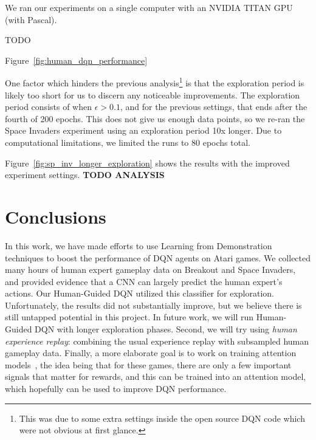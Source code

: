 \documentclass[letterpaper, 10pt, conference]{ieeeconf}
\begin{document}
We ran our experiments on a single computer with an NVIDIA TITAN GPU (with
Pascal).

TODO

Figure~\ref{fig:human_dqn_performance}

One factor which hinders the previous analysis\footnote{This was due to some
extra settings inside the open source DQN code which were not obvious at first
glance.} is that the exploration period is likely too short for us to discern
any noticeable improvements. The exploration period consists of when
$\epsilon>0.1$, and for the previous settings, that ends after the fourth of 200
epochs. This does not give us enough data points, so we re-ran the Space
Invaders experiment using an exploration period 10x longer. Due to computational
limitations, we limited the runs to 80 epochs total.

Figure~\ref{fig:sp_inv_longer_exploration} shows the results with the improved
experiment settings. \textbf{TODO ANALYSIS}




\section{Conclusions}\label{sec:conclusions}

In this work, we have made efforts to use Learning from Demonstration techniques
to boost the performance of DQN agents on Atari games. We collected many hours
of human expert gameplay data on Breakout and Space Invaders, and provided
evidence that a CNN can largely predict the human expert's actions. Our
Human-Guided DQN utilized this classifier for exploration. Unfortunately, the
results did not substantially improve, but we believe there is still untapped
potential in this project. In future work, we will run Human-Guided DQN with
longer exploration phases. Second, we will try using \emph{human experience
replay}: combining the usual experience replay with subsampled human gameplay
data. Finally, a more elaborate goal is to work on training attention
models~\cite{NIPS2014_5542,icml2015_xuc15}, the idea being that for these games,
there are only a few important signals that matter for rewards, and this can be
trained into an attention model, which hopefully can be used to improve DQN
performance.



\end{document}

